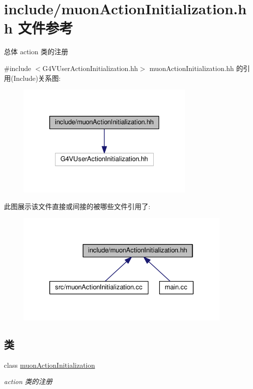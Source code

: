 \hypertarget{muonActionInitialization_8hh}{}\section{include/muon\+Action\+Initialization.hh 文件参考}
\label{muonActionInitialization_8hh}


总体 action 类的注册  


{\ttfamily \#include $<$G4\+V\+User\+Action\+Initialization.\+hh$>$}\newline
muon\+Action\+Initialization.\+hh 的引用(Include)关系图\+:\nopagebreak
\begin{figure}[H]
\begin{center}
\leavevmode
\includegraphics[width=247pt]{muonActionInitialization_8hh__incl}
\end{center}
\end{figure}
此图展示该文件直接或间接的被哪些文件引用了\+:\nopagebreak
\begin{figure}[H]
\begin{center}
\leavevmode
\includegraphics[width=299pt]{muonActionInitialization_8hh__dep__incl}
\end{center}
\end{figure}
\subsection*{类}
\begin{DoxyCompactItemize}
\item 
class \hyperlink{classmuonActionInitialization}{muon\+Action\+Initialization}
\begin{DoxyCompactList}\small\item\em action 类的注册 \end{DoxyCompactList}\end{DoxyCompactItemize}


